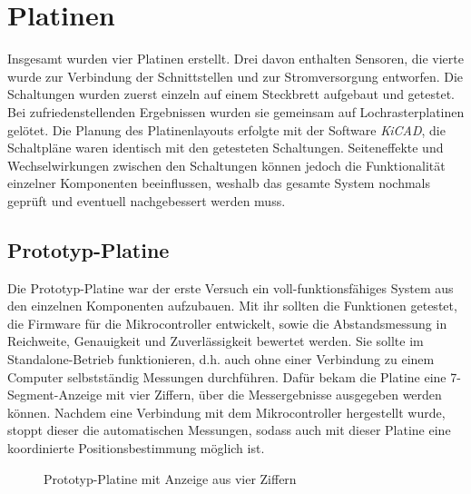 
\chapter{Platinen}
Insgesamt wurden vier Platinen erstellt. Drei davon enthalten Sensoren, die vierte wurde zur Verbindung der Schnittstellen und zur Stromversorgung entworfen. Die Schaltungen wurden zuerst einzeln auf einem Steckbrett aufgebaut und getestet. Bei zufriedenstellenden Ergebnissen wurden sie gemeinsam auf Lochrasterplatinen gelötet. Die Planung des Platinenlayouts erfolgte mit der Software \textit{KiCAD}, die Schaltpläne waren identisch mit den getesteten Schaltungen. Seiteneffekte und Wechselwirkungen zwischen den Schaltungen können jedoch die Funktionalität einzelner Komponenten beeinflussen, weshalb das gesamte System nochmals geprüft und eventuell nachgebessert werden muss.


\section{Prototyp-Platine}
Die Prototyp-Platine war der erste Versuch ein voll-funktionsfähiges System aus den einzelnen Komponenten aufzubauen. Mit ihr sollten die Funktionen getestet, die Firmware für die Mikrocontroller entwickelt, sowie die Abstandsmessung in Reichweite, Genauigkeit und Zuverlässigkeit bewertet werden. Sie sollte im Standalone-Betrieb funktionieren, d.h. auch ohne einer Verbindung zu einem Computer selbstständig Messungen durchführen. Dafür bekam die Platine eine 7-Segment-Anzeige mit vier Ziffern, über die Messergebnisse ausgegeben werden können. Nachdem eine Verbindung mit dem Mikrocontroller hergestellt wurde, stoppt dieser die automatischen Messungen, sodass auch mit dieser Platine eine koordinierte Positionsbestimmung möglich ist.

\begin{figure}[H]
	\centering
	\caption{Prototyp-Platine mit Anzeige aus vier Ziffern} \label{img:prototype}
\end{figure}

